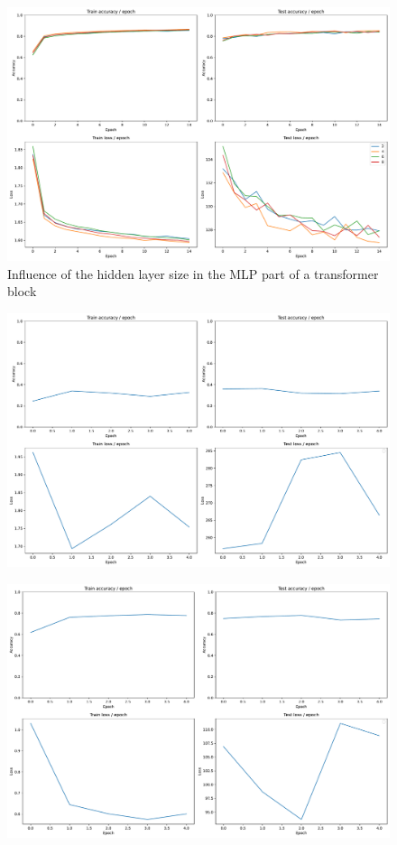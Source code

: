 \begin{figure}[H]
    \centering
    \includegraphics*[width=\textwidth]{figs/Transformers/fashion-MNIST/mlp_ratio_influence.pdf}
    \caption{Influence of the hidden layer size in the MLP part of a transformer block}
    \label{fig:mlp_ratio_influence}
\end{figure}

\begin{figure}[H]
    \centering
    \includegraphics*[width=\textwidth]{figs/Transformers/fashion-MNIST/stats_vit.pdf}
    \caption{}
    \label{fig:}
\end{figure}

\begin{figure}[H]
    \centering
    \includegraphics*[width=\textwidth]{figs/Transformers/fashion-MNIST/stats_vit_pretrained.pdf}
    \caption{}
    \label{fig:}
\end{figure}